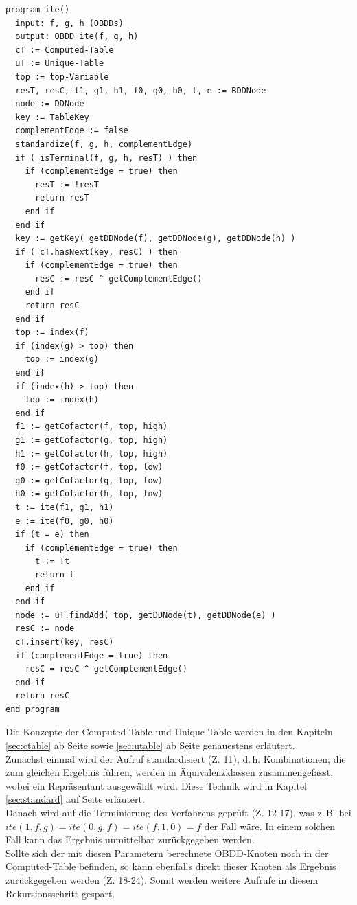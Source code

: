 \begin{lstlisting}[frame=htrbl, caption={Implementierung von {\ttfamily ite}}, label={lst:ite}]
program ite()
  input: f, g, h (OBDDs)
  output: OBDD ite(f, g, h)
  cT := Computed-Table
  uT := Unique-Table
  top := top-Variable
  resT, resC, f1, g1, h1, f0, g0, h0, t, e := BDDNode
  node := DDNode
  key := TableKey
  complementEdge := false
  standardize(f, g, h, complementEdge)
  if ( isTerminal(f, g, h, resT) ) then
    if (complementEdge = true) then
      resT := !resT
      return resT
    end if
  end if
  key := getKey( getDDNode(f), getDDNode(g), getDDNode(h) )
  if ( cT.hasNext(key, resC) ) then 
    if (complementEdge = true) then
      resC := resC ^ getComplementEdge()
    end if
    return resC
  end if
  top := index(f)
  if (index(g) > top) then
    top := index(g)
  end if
  if (index(h) > top) then
    top := index(h)
  end if
  f1 := getCofactor(f, top, high)
  g1 := getCofactor(g, top, high)
  h1 := getCofactor(h, top, high)
  f0 := getCofactor(f, top, low)
  g0 := getCofactor(g, top, low)
  h0 := getCofactor(h, top, low)
  t := ite(f1, g1, h1)
  e := ite(f0, g0, h0)
  if (t = e) then
    if (complementEdge = true) then
      t := !t
      return t
    end if
  end if
  node := uT.findAdd( top, getDDNode(t), getDDNode(e) )
  resC := node
  cT.insert(key, resC)
  if (complementEdge = true) then 
    resC = resC ^ getComplementEdge()
  end if
  return resC
end program
\end{lstlisting}
Die Konzepte der Computed-Table und Unique-Table werden in den Kapiteln \ref{sec:ctable} ab Seite \pageref{sec:ctable} sowie \ref{sec:utable} ab Seite \pageref{sec:utable} genauestens erläutert.\\
Zunächst einmal wird der Aufruf standardisiert (Z. 11), d.\,h. Kombinationen, die zum gleichen Ergebnis führen, werden in Äquivalenzklassen zusammengefasst, wobei ein Repräsentant ausgewählt wird. Diese Technik wird in Kapitel \ref{sec:standard} auf Seite \pageref{sec:standard} erläutert.\\
Danach wird auf die Terminierung des Verfahrens geprüft (Z. 12-17), was z.\,B. bei $ite(1, f, g) = ite(0, g, f) = ite(f, 1, 0) = f$ der Fall wäre. In einem solchen Fall kann das Ergebnis unmittelbar zurückgegeben werden.\\
Sollte sich der mit diesen Parametern berechnete OBDD-Knoten noch in der Computed-Table befinden, so kann ebenfalls direkt dieser Knoten als Ergebnis zurückgegeben werden (Z. 18-24). Somit werden weitere Aufrufe in diesem Rekursionsschritt gespart.\\
